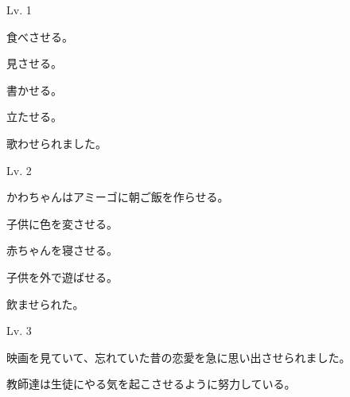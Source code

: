 
\author{Tomislav Mamić}

	
	\begin{mondai}{Lv. 1}
		\item 食べさせる。
		\item 見させる。
		\item 書かせる。
		\item 立たせる。
		\item 歌わせられました。
	\end{mondai}
	
	\begin{mondai}{Lv. 2}
		\item かわちゃんはアミーゴに朝ご飯を作らせる。
		\item 子供に色を変させる。
		\item 赤ちゃんを寝させる。
		\item 子供を外で遊ばせる。
		\item 飲ませられた。
	\end{mondai}
	
	\begin{mondai}{Lv. 3}
		\item 映画を見ていて、忘れていた昔の恋愛を急に思い出させられました。
		\item 教師達は生徒にやる気を起こさせるように努力している。
	\end{mondai}
